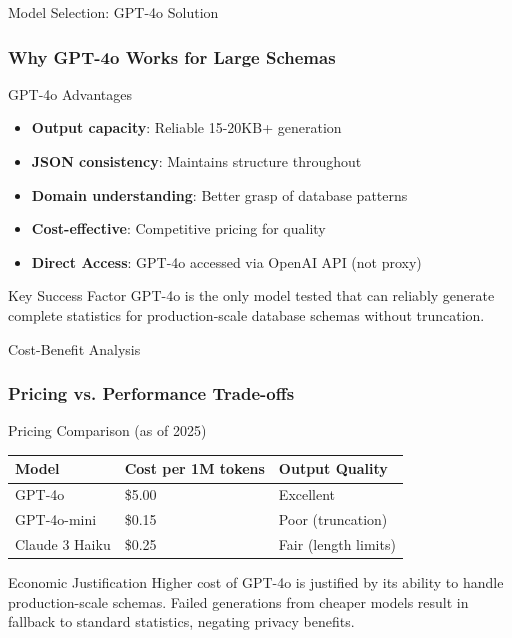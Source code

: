 \documentclass[smaller]{beamer}
\begin{document}
\begin{frame}{Model Selection: GPT-4o Solution}
\frametitle{Why GPT-4o Works for Large Schemas}

\begin{block}{GPT-4o Advantages}
\begin{itemize}
    \item \textbf{Output capacity}: Reliable 15-20KB+ generation
    \item \textbf{JSON consistency}: Maintains structure throughout
    \item \textbf{Domain understanding}: Better grasp of database patterns
    \item \textbf{Cost-effective}: Competitive pricing for quality
    \item \textbf{Direct Access}: GPT-4o accessed via OpenAI API (not proxy)
\end{itemize}
\end{block}

\begin{alertblock}{Key Success Factor}
GPT-4o is the only model tested that can reliably generate complete statistics for production-scale database schemas without truncation.
\end{alertblock}

\end{frame}

\begin{frame}{Cost-Benefit Analysis}
\frametitle{Pricing vs. Performance Trade-offs}

\begin{exampleblock}{Pricing Comparison (as of 2025)}
\begin{tabular}{lll}
\toprule
Model & Cost per 1M tokens & Output Quality \\
\midrule
GPT-4o & \$5.00 & Excellent \\
GPT-4o-mini & \$0.15 & Poor (truncation) \\
Claude 3 Haiku & \$0.25 & Fair (length limits) \\
\bottomrule
\end{tabular}
\end{exampleblock}

\begin{alertblock}{Economic Justification}
Higher cost of GPT-4o is justified by its ability to handle production-scale schemas. Failed generations from cheaper models result in fallback to standard statistics, negating privacy benefits.
\end{alertblock}

\end{frame}
\end{document}
